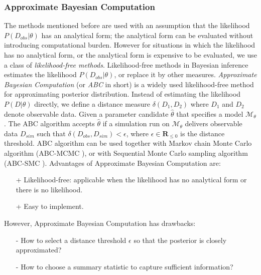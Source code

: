 \subsubsection{Approximate Bayesian Computation}
The methods mentioned before are used with an assumption that the likelihood $P(D_{obs}|\theta)$ has
an analytical form; the analytical form can be evaluated without introducing computational burden.
However for situations in which the likelihood has no analytical form, or the analytical form is
expensive to be evaluated, we use a class of \textit{likelihood-free methods}. Likelihood-free
methods in Bayesian inference estimates the likelihood $P(D_{obs}|\theta)$, or replace it by other
measures. \textit{Approximate Bayesian Computation} (or \textit{ABC} in short)
\cite{toni2009approximate} is a widely used likelihood-free method for approximating posterior
distribution. Instead of estimating the likelihood $P(D|\theta)$ directly, we define a distance
measure $\delta(D_1, D_2)$ where $D_1$ and $D_2$ denote observable data. Given a parameter candidate
$\hat{\theta}$ that specifies a model $\mathcal{M}_\theta$. The ABC algorithm accepts $\hat{\theta}$
if a simulation run on $\mathcal{M}_\theta$ delivers observable data $D_{sim}$ such that
$\delta(D_{obs},D_{sim}) < \epsilon$, where $\epsilon\in\mathbf{R}_{\leq 0}$ is the distance
threshold. ABC algorithm can be used together with Markov chain Monte Carlo algorithm (ABC-MCMC
\cite{sadegh2014approximate} \cite{plagnol2004approximate}), or with Sequential Monte Carlo sampling
algorithm (ABC-SMC \cite{sisson2007sequential} \cite{molyneux2020abc}). Advantages of Approximate
Bayesian Computation are:
\begin{itemize}
    \item[+] Likelihood-free: applicable when the likelihood has no analytical form or there is no
          likelihood.
    \item[+] Easy to implement.
\end{itemize}
However, Approximate Bayesian Computation has drawbacks:
\begin{itemize}
    \item[-] How to select a distance threshold $\epsilon$ so that the posterior is closely
          approximated? \cite{sisson2007sequential}
    \item[-] How to choose a summary statistic to capture sufficient information?
          \cite{csillery2010approximate}
\end{itemize}

